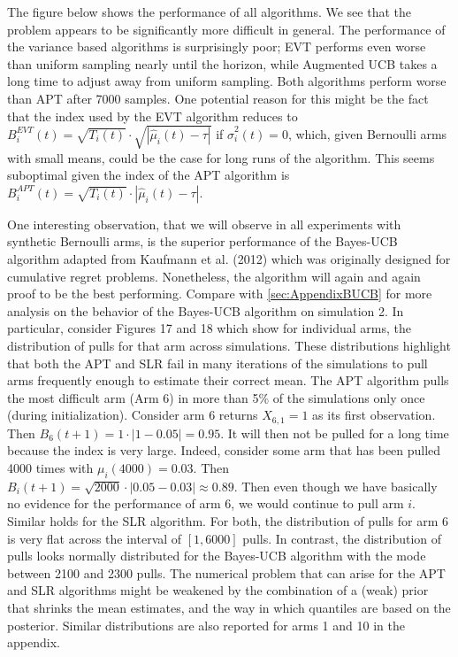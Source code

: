\documentclass[11pt,]{article}
\begin{document}
The figure below shows the performance of all algorithms. We see that
the problem appears to be significantly more difficult in general. The
performance of the variance based algorithms is surprisingly poor; EVT
performs even worse than uniform sampling nearly until the horizon,
while Augmented UCB takes a long time to adjust away from uniform
sampling. Both algorithms perform worse than APT after 7000 samples. One
potential reason for this might be the fact that the index used by the
EVT algorithm reduces to
\(B_i^{EVT}(t) = \sqrt{T_i(t)} \cdot \sqrt{|\hat{\mu}_i(t) - \tau|}\) if
\(\hat{\sigma}_i^2(t) = 0\), which, given Bernoulli arms with small
means, could be the case for long runs of the algorithm. This seems
suboptimal given the index of the APT algorithm is
\(B_i^{APT}(t) = \sqrt{T_i(t)} \cdot |\hat{\mu}_i(t) - \tau|\).

One interesting observation, that we will observe in all experiments
with synthetic Bernoulli arms, is the superior performance of the
Bayes-UCB algorithm adapted from Kaufmann et al. (2012) which was
originally designed for cumulative regret problems. Nonetheless, the
algorithm will again and again proof to be the best performing. Compare
with \autoref{sec:AppendixBUCB} for more analysis on the behavior of the
Bayes-UCB algorithm on simulation 2. In particular, consider Figures 17
and 18 which show for individual arms, the distribution of pulls for
that arm across simulations. These distributions highlight that both the
APT and SLR fail in many iterations of the simulations to pull arms
frequently enough to estimate their correct mean. The APT algorithm
pulls the most difficult arm (Arm 6) in more than 5\% of the simulations
only once (during initialization). Consider arm 6 returns
\(X_{6,1} = 1\) as its first observation. Then
\(B_6(t+1) = 1 \cdot |1-0.05| = 0.95\). It will then not be pulled for a
long time because the index is very large. Indeed, consider some arm
that has been pulled 4000 times with \(\mu_i(4000) = 0.03\). Then
\(B_i(t+1) = \sqrt{2000} \cdot |0.05-0.03| \approx 0.89\). Then even
though we have basically no evidence for the performance of arm \(6\),
we would continue to pull arm \(i\). Similar holds for the SLR
algorithm. For both, the distribution of pulls for arm 6 is very flat
across the interval of \([1,6000]\) pulls. In contrast, the distribution
of pulls looks normally distributed for the Bayes-UCB algorithm with the
mode between 2100 and 2300 pulls. The numerical problem that can arise
for the APT and SLR algorithms might be weakened by the combination of a
(weak) prior that shrinks the mean estimates, and the way in which
quantiles are based on the posterior. Similar distributions are also
reported for arms 1 and 10 in the appendix.
\end{document}
